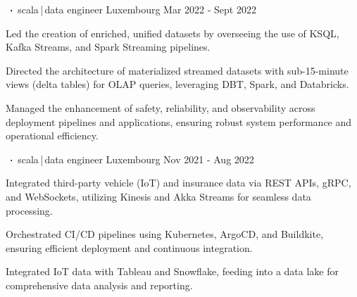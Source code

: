 \begin{cventries}
    \cventry
    {     }
    {$\sqbig$scala\,|\,data engineer}
    {Luxembourg}
    {Mar 2022 - Sept 2022}
    {}
    {
        \begin{cvitems}
            \item{Led the creation of enriched, unified datasets by overseeing the use of KSQL, Kafka Streams, and Spark Streaming pipelines.}
            \item{Directed the architecture of materialized streamed datasets with sub-15-minute views (delta tables) for OLAP queries, leveraging DBT, Spark, and Databricks.}
            \item{Managed the enhancement of safety, reliability, and observability across deployment pipelines and applications, ensuring robust system performance and operational efficiency.}
        \end{cvitems}
    }


    \cventry
    {       }
    {$\sqbig$scala\,|\,data engineer}
    {Luxembourg}
    {Nov 2021 - Aug 2022}
    {}
    {
        \begin{cvitems}
            \item{Integrated third-party vehicle (IoT) and insurance data via REST APIs, gRPC, and WebSockets, utilizing Kinesis and Akka Streams for seamless data processing.}
            \item{Orchestrated CI/CD pipelines using Kubernetes, ArgoCD, and Buildkite, ensuring efficient deployment and continuous integration.}
            \item{Integrated IoT data with Tableau and Snowflake, feeding into a data lake for comprehensive data analysis and reporting.}
        \end{cvitems}
    }


\end{cventries}
